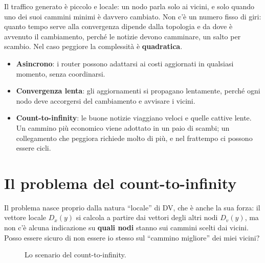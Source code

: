 Il traffico generato è piccolo e locale: un nodo parla solo ai vicini, e solo quando uno dei suoi cammini minimi è davvero
cambiato. Non c'è un numero fisso di giri: quanto tempo serve alla convergenza dipende dalla topologia e da dove è avvenuto il
cambiamento, perché le notizie devono camminare, un salto per scambio. Nel caso peggiore la complessità è
\textbf{quadratica}.

\begin{itemize}
    \item[\itick] \textbf{Asincrono}: i router possono adattarsi ai costi aggiornati in qualsiasi momento, senza coordinarsi.
    \item[\icross] \textbf{Convergenza lenta}: gli aggiornamenti si propagano lentamente, perché ogni nodo deve accorgersi del
          cambiamento e avvisare i vicini.
    \item[\icross] \textbf{Count-to-infinity}: le buone notizie viaggiano veloci e quelle cattive lente. Un cammino più economico
          viene adottato in un paio di scambi; un collegamento che peggiora richiede molto di più, e nel frattempo ci possono
          essere cicli.
\end{itemize}

\section{Il problema del count-to-infinity}

Il problema nasce proprio dalla natura ``locale'' di DV, che è anche la sua forza: il vettore locale $D_x(y)$ si calcola a
partire dai vettori degli altri nodi $D_v(y)$, ma non c'è alcuna indicazione su \textbf{quali nodi} stanno sui cammini scelti
dai vicini. Posso essere sicuro di non essere io stesso sul ``cammino migliore'' dei miei vicini?

\begin{figure}[H]
\centering
{}
\caption{Lo scenario del count-to-infinity.}
\end{figure}

